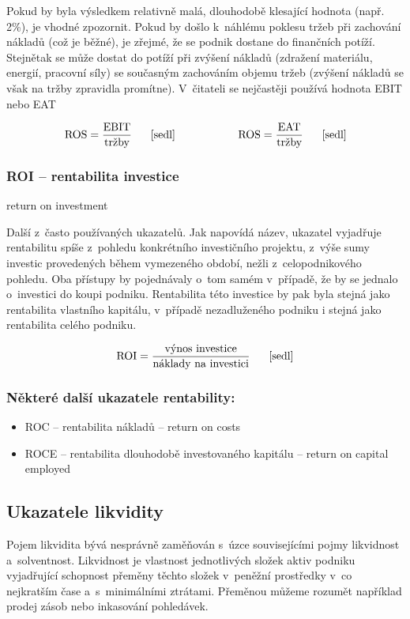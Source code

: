 Pokud by byla výsledkem relativně malá, dlouhodobě klesající hodnota (např. 2\%), je vhodné zpozornit. Pokud by došlo k~náhlému poklesu tržeb při zachování nákladů (což je běžné), je zřejmé, že se podnik dostane do finančních potíží. Stejnětak se může dostat do potíží při zvýšení nákladů (zdražení materiálu, energií, pracovní síly) se současným zachováním objemu tržeb (zvýšení nákladů se však na tržby zpravidla promítne). 
V~čitateli se nejčastěji používá hodnota EBIT nebo EAT

$$\vz{ROS}{EBIT}{tržby} \scite{sedl} \hspace{2cm} \vz{ROS}{EAT}{tržby} \scite{sedl}$$ 

\subsubsection{ROI -- rentabilita investice}
return on investment

Další z~často používaných ukazatelů. Jak napovídá název, ukazatel vyjadřuje rentabilitu spíše z~pohledu konkrétního investičního projektu, z~výše sumy investic provedených během vymezeného období, nežli z~celopodnikového pohledu. Oba přístupy by pojednávaly o~tom samém v~případě, že by se jednalo o~investici do koupi podniku. Rentabilita této investice by pak byla stejná jako rentabilita vlastního kapitálu, v~případě nezadluženého podniku i stejná jako rentabilita celého podniku.

$$\vz{ROI}{výnos investice}{náklady na investici} \scite{sedl} $$ 

\subsubsection{Některé další ukazatele rentability:}
\begin{itemize}
\item{ROC -- rentabilita nákladů} -- return on costs
\item{ROCE -- rentabilita dlouhodobě investovaného kapitálu} -- return on capital employed
\end{itemize}







\subsection{Ukazatele likvidity}
Pojem likvidita bývá nesprávně zaměňován s~úzce souvisejícími pojmy likvidnost a~solventnost. Likvidnost je vlastnost jednotlivých složek aktiv podniku vyjadřující schopnost přeměny těchto složek v~peněžní prostředky v~co nejkratším čase a~s~minimálními ztrátami\cite{nyvlt}. Přeměnou můžeme rozumět například prodej zásob nebo inkasování pohledávek. 

